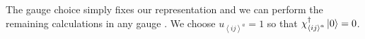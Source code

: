 \documentclass[aps,pra,preprint,groupedaddress]{revtex4-1}
\newcommand{\1}{\mathds{1}}
\begin{document}
The gauge choice simply fixes our representation and we can perform the remaining calculations in any gauge \cite{Kitaev,Baskaran}. %
We choose $u_{\left<ij\right>^a} =1$ so that $\chi_{\left<ij\right>^a}^\dagger \ket{0} =0$.

\end{document}
